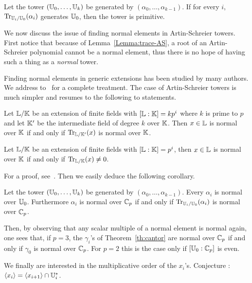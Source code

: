 \begin{corollary}
  Let the tower $(\mathbb{U}_0,\ldots,\mathbb{U}_k)$ be generated by
  $(\alpha_0,\ldots,\alpha_{k-1})$. If for every $i$,
  $\operatorname{Tr}_{\mathbb{U}_i/\mathbb{U}_0}(\alpha_i)$ generates $\mathbb{U}_0$, then the tower is
  primitive.
\end{corollary}

We now discuss the issue of finding normal elements in Artin-Schreier
towers. First notice that because of Lemma~\ref{Lemma:trace-AS}, a
root of an Artin-Schreier polynomial cannot be a normal element, thus
there is no hope of having such a thing as a \emph{normal} tower.

Finding normal elements in generic extensions has been studied by many
authors. We address to~\cite{Hach} for a complete treatment. The case
of Artin-Schreier towers is much simpler and resumes to the following
to statements.

\begin{proposition}
  Let $\mathbb{L}/\mathbb{K}$ be an extension of finite fields with $[\mathbb{L}:\mathbb{K}]=kp^i$
  where $k$ is prime to $p$ and let $\mathbb{K}'$ be the intermediate field of
  degree $k$ over $\mathbb{K}$. Then $x\in\mathbb{L}$ is normal over $\mathbb{K}$ if and only
  if $\operatorname{Tr}_{\mathbb{L}/\mathbb{K}'}(x)$ is normal over $\mathbb{K}$.
\end{proposition}

\begin{corollary}
  Let $\mathbb{L}/\mathbb{K}$ be an extension of finite fields with $[\mathbb{L}:\mathbb{K}]=p^i$,
  then $x\in\mathbb{L}$ is normal over $\mathbb{K}$ if and only if
  $\operatorname{Tr}_{\mathbb{L}/\mathbb{K}}(x)\ne0$.
\end{corollary}

For a proof, see~\cite[Section 5]{Hach}. Then we easily deduce the
following corollary.

\begin{corollary}
  Let the tower $(\mathbb{U}_0,\ldots,\mathbb{U}_k)$ be generated by
  $(\alpha_0,\ldots,\alpha_{k-1})$. Every $\alpha_i$ is normal over
  $\mathbb{U}_0$. Furthermore $\alpha_i$ is normal over $\mathbb{C}_p$ if and only if
  $\operatorname{Tr}_{\mathbb{U}_i/\mathbb{U}_0}(\alpha_i)$ is normal over $\mathbb{C}_p$.
\end{corollary}

Then, by observing that any scalar multiple of a normal element is
normal again, one sees that, if $p=3$, the $\gamma_i$'s of
Theorem~\ref{th:cantor} are normal over $\mathbb{C}_p$ if and only if
$\gamma_0$ is normal over $\mathbb{C}_p$. For $p=2$ this is the case only if
$[\mathbb{U}_0:\mathbb{C}_p]$ is even.

We finally are interested in the multiplicative order of the
$x_i$'s. Conjecture : $\langle x_i\rangle = \langle
x_{i+1}\rangle\cap\mathbb{U}_i^\ast$.


%
